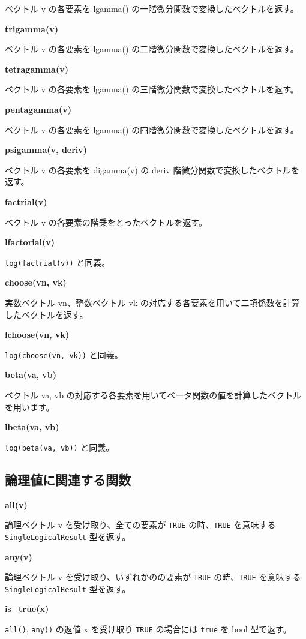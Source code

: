 \documentclass[]{book}
\begin{document}
ベクトル v の各要素を lgamma() の一階微分関数で変換したベクトルを返す。

\textbf{trigamma(v)}

ベクトル v の各要素を lgamma() の二階微分関数で変換したベクトルを返す。

\textbf{tetragamma(v)}

ベクトル v の各要素を lgamma() の三階微分関数で変換したベクトルを返す。

\textbf{pentagamma(v)}

ベクトル v の各要素を lgamma() の四階微分関数で変換したベクトルを返す。

\textbf{psigamma(v, deriv)}

ベクトル v の各要素を digamma(v) の deriv 階微分関数で変換したベクトルを返す。

\textbf{factrial(v)}

ベクトル v の各要素の階乗をとったベクトルを返す。

\textbf{lfactorial(v)}

\texttt{log(factrial(v))} と同義。

\textbf{choose(vn, vk)}

実数ベクトル vn、整数ベクトル vk の対応する各要素を用いて二項係数を計算したベクトルを返す。

\textbf{lchoose(vn, vk)}

\texttt{log(choose(vn,\ vk))} と同義。

\textbf{beta(va, vb)}

ベクトル va, vb の対応する各要素を用いてベータ関数の値を計算したベクトルを用います。

\textbf{lbeta(va, vb)}

\texttt{log(beta(va,\ vb))} と同義。

\subsection{論理値に関連する関数}

\textbf{all(v)}

論理ベクトル v を受け取り、全ての要素が \texttt{TRUE} の時、\texttt{TRUE} を意味する \texttt{SingleLogicalResult} 型を返す。

\textbf{any(v)}

論理ベクトル v を受け取り、いずれかのの要素が \texttt{TRUE} の時、\texttt{TRUE} を意味する \texttt{SingleLogicalResult} 型を返す。

\textbf{is\_true(x)}

\texttt{all()}, \texttt{any()} の返値 x を受け取り \texttt{TRUE} の場合には \texttt{true} を bool 型で返す。
\end{document}
